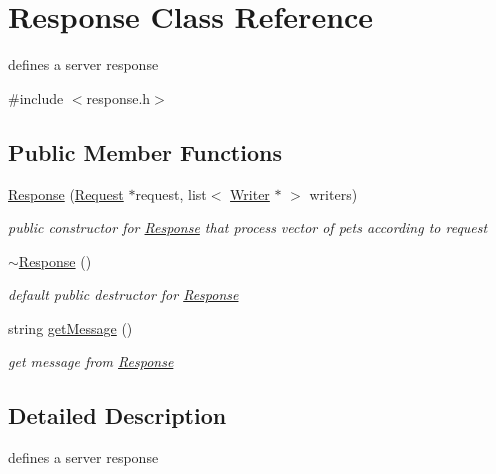 \hypertarget{classResponse}{\section{Response Class Reference}
\label{classResponse}
}


defines a server response  




{\ttfamily \#include $<$response.\-h$>$}

\subsection*{Public Member Functions}
\begin{DoxyCompactItemize}
\item 
\hyperlink{classResponse_a6d51247167bff1aafa5d8330db41767d}{Response} (\hyperlink{classRequest}{Request} $\ast$request, list$<$ \hyperlink{classWriter}{Writer} $\ast$ $>$ writers)
\begin{DoxyCompactList}\small\item\em public constructor for \hyperlink{classResponse}{Response} that process vector of pets according to request \end{DoxyCompactList}\item 
\hypertarget{classResponse_a2a4a6403aaefce73725f17cf63896f84}{\hyperlink{classResponse_a2a4a6403aaefce73725f17cf63896f84}{$\sim$\-Response} ()}\label{classResponse_a2a4a6403aaefce73725f17cf63896f84}

\begin{DoxyCompactList}\small\item\em default public destructor for \hyperlink{classResponse}{Response} \end{DoxyCompactList}\item 
string \hyperlink{classResponse_ac1f4a94dd37141bd114414747ae02dca}{get\-Message} ()
\begin{DoxyCompactList}\small\item\em get message from \hyperlink{classResponse}{Response} \end{DoxyCompactList}\end{DoxyCompactItemize}


\subsection{Detailed Description}
defines a server response 

